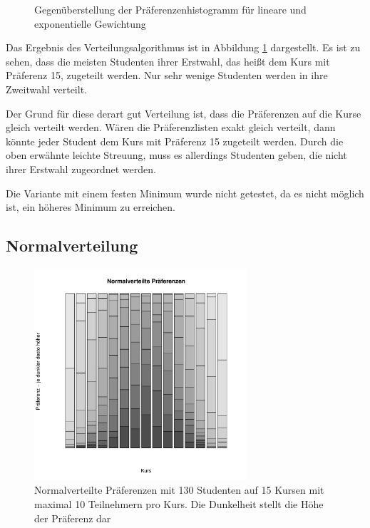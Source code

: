 \begin{figure}
\begin{subfigure}{0.49\textwidth}
				\end{subfigure}
				\caption{Gegenüberstellung der Präferenzenhistogramm für lineare und exponentielle Gewichtung}
				\label{fig:test_equal_distribution_histogram}
			\end{figure}
			
			Das Ergebnis des Verteilungsalgorithmus ist in Abbildung \ref{fig:test_equal_distribution_histogram} dargestellt.
			Es ist zu sehen, dass die meisten Studenten ihrer Erstwahl, das heißt dem Kurs mit Präferenz 15, zugeteilt werden.
			Nur sehr wenige Studenten werden in  ihre Zweitwahl verteilt.
			
			Der Grund für diese derart gut Verteilung ist, dass die Präferenzen auf die Kurse gleich verteilt werden.
            Wären die Präferenzlisten exakt gleich verteilt, dann könnte jeder Student dem Kurs mit Präferenz 15 zugeteilt werden.
            Durch die oben erwähnte leichte Streuung, muss es allerdings Studenten geben, die nicht ihrer Erstwahl zugeordnet werden.
            
            Die Variante mit einem festen Minimum wurde nicht getestet, da es nicht möglich ist, ein höheres Minimum zu erreichen.
		
		\subsection{Normalverteilung}
		\label{sec:testing:normaldistribution}
		
			\begin{figure}
				\centering
				\includegraphics[width=0.7\textwidth]{./testing/images/NormalDistPreferencesDist.jpg}
				\caption{Normalverteilte Präferenzen mit 130 Studenten auf 15 Kursen mit maximal 10 Teilnehmern pro Kurs. Die Dunkelheit stellt die Höhe der Präferenz dar}
				\label{fig:test_norm_distribution}
			\end{figure}
        
